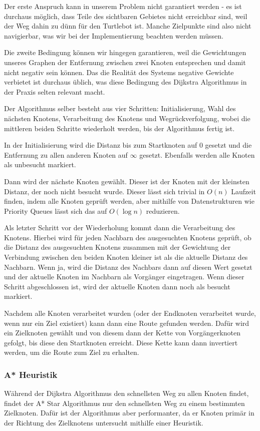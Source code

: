 Der erste Anspruch kann in unserem Problem nicht garantiert werden - es ist durchaus möglich, dass Teile des sichtbaren
Gebietes nicht erreichbar sind, weil der Weg dahin zu dünn für den Turtlebot ist.
Manche Zielpunkte sind also nicht navigierbar, was wir bei der Implementierung beachten werden müssen.

Die zweite Bedingung können wir hingegen garantieren, weil die Gewichtungen unseres Graphen der Entfernung zwischen
zwei Knoten entsprechen und damit nicht negativ sein können.
Das die Realität des Systems negative Gewichte verbietet ist durchaus üblich, was diese Bedingung des Dijkstra Algorithmus
in der Praxis selten relevant macht.



Der Algorithmus selber besteht aus vier Schritten: Initialisierung, Wahl des nächsten Knotens, Verarbeitung des Knotens und Wegrückverfolgung,
wobei die mittleren beiden Schritte wiederholt werden, bis der Algorithmus fertig ist.

In der Initialisierung wird die Distanz bis zum Startknoten auf 0 gesetzt und die Entfernung zu allen anderen Knoten auf
$\infty$ gesetzt.
Ebenfalls werden alle Knoten als unbesucht markiert.

Dann wird der nächste Knoten gewählt.
Dieser ist der Knoten mit der kleinsten Distanz, der noch nicht besucht wurde.
Dieser lässt sich trivial in $O(n)$ Laufzeit finden, indem alle Knoten geprüft werden, aber mithilfe von Datenstrukturen
wie Priority Queues lässt sich das auf $O(\log n)$ reduzieren.

Als letzter Schritt vor der Wiederholung kommt dann die Verarbeitung des Knotens.
Hierbei wird für jeden Nachbarn des ausgesuchten Knotens geprüft, ob die Distanz des ausgesuchten Knotens zusammen mit der
Gewichtung der Verbindung zwischen den beiden Knoten kleiner ist als die aktuelle Distanz des Nachbarn.
Wenn ja, wird die Distanz des Nachbars dann auf diesen Wert gesetzt und der aktuelle Knoten im Nachbarn als Vorgänger
eingetragen.
Wenn dieser Schritt abgeschlossen ist, wird der aktuelle Knoten dann noch als besucht markiert.

Nachdem alle Knoten verarbeitet wurden (oder der Endknoten verarbeitet wurde, wenn nur ein Ziel existiert) kann dann eine
Route gefunden werden.
Dafür wird ein Zielknoten gewählt und von diesem dann der Kette von Vorgängerknoten gefolgt, bis diese den Startknoten
erreicht.
Diese Kette kann dann invertiert werden, um die Route zum Ziel zu erhalten.
\subsubsection{A* Heuristik}\label{subsubsec:astar}
Während der Dijkstra Algorithmus den schnellsten Weg zu allen Knoten findet, findet der A* Star Algorithmus nur den
schnellsten Weg zu einem bestimmten Zielknoten.
Dafür ist der Algorithmus aber performanter, da er Knoten primär in der Richtung des Zielknotens untersucht mithilfe
einer Heuristik.

